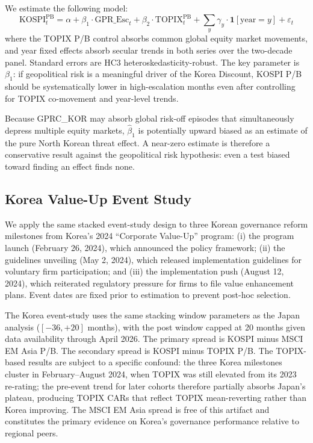 We estimate the following model:
\begin{equation}
    \text{KOSPI}_{t}^{\text{PB}} = \alpha + \beta_1 \cdot \text{GPR\_Esc}_{t} + \beta_2 \cdot \text{TOPIX}_{t}^{\text{PB}} + \sum_{y} \gamma_y \cdot \mathbf{1}[\text{year} = y] + \varepsilon_t
\end{equation}
where the TOPIX P/B control absorbs common global equity market movements, and year fixed effects absorb secular trends in both series over the two-decade panel. Standard errors are HC3 heteroskedasticity-robust. The key parameter is $\beta_1$: if geopolitical risk is a meaningful driver of the Korea Discount, KOSPI P/B should be systematically lower in high-escalation months even after controlling for TOPIX co-movement and year-level trends.

Because GPRC\_KOR may absorb global risk-off episodes that simultaneously depress multiple equity markets, $\hat{\beta}_1$ is potentially upward biased as an estimate of the pure North Korean threat effect. A near-zero estimate is therefore a conservative result against the geopolitical risk hypothesis: even a test biased toward finding an effect finds none.

\subsection{Korea Value-Up Event Study}

We apply the same stacked event-study design to three Korean governance reform milestones from Korea's 2024 ``Corporate Value-Up'' program: (i) the program launch (February 26, 2024), which announced the policy framework; (ii) the guidelines unveiling (May 2, 2024), which released implementation guidelines for voluntary firm participation; and (iii) the implementation push (August 12, 2024), which reiterated regulatory pressure for firms to file value enhancement plans. Event dates are fixed prior to estimation to prevent post-hoc selection.

The Korea event-study uses the same stacking window parameters as the Japan analysis ($[-36, +20]$ months), with the post window capped at 20 months given data availability through April 2026. The primary spread is KOSPI minus MSCI EM Asia P/B. The secondary spread is KOSPI minus TOPIX P/B. The TOPIX-based results are subject to a specific confound: the three Korea milestones cluster in February--August 2024, when TOPIX was still elevated from its 2023 re-rating; the pre-event trend for later cohorts therefore partially absorbs Japan's plateau, producing TOPIX CARs that reflect TOPIX mean-reverting rather than Korea improving. The MSCI EM Asia spread is free of this artifact and constitutes the primary evidence on Korea's governance performance relative to regional peers.

